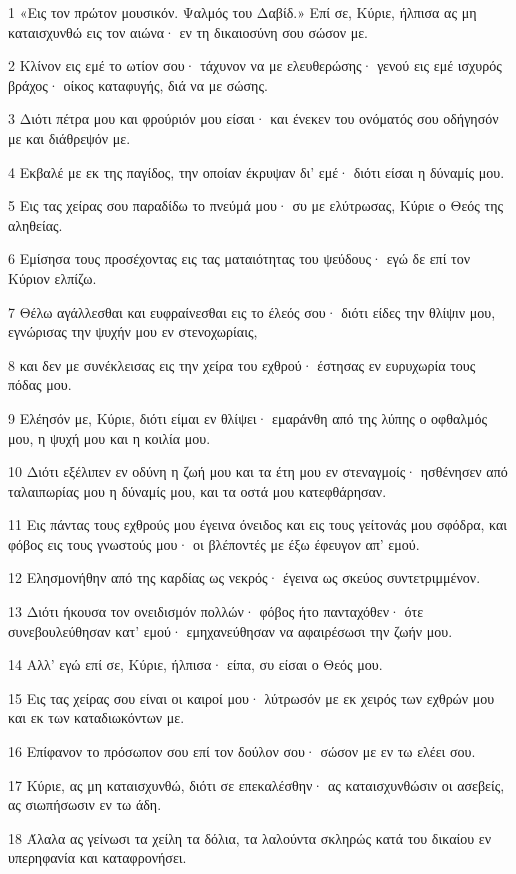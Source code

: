 \par 1 «Εις τον πρώτον μουσικόν. Ψαλμός του Δαβίδ.» Επί σε, Κύριε, ήλπισα ας μη καταισχυνθώ εις τον αιώνα· εν τη δικαιοσύνη σου σώσον με.
\par 2 Κλίνον εις εμέ το ωτίον σου· τάχυνον να με ελευθερώσης· γενού εις εμέ ισχυρός βράχος· οίκος καταφυγής, διά να με σώσης.
\par 3 Διότι πέτρα μου και φρούριόν μου είσαι· και ένεκεν του ονόματός σου οδήγησόν με και διάθρεψόν με.
\par 4 Εκβαλέ με εκ της παγίδος, την οποίαν έκρυψαν δι' εμέ· διότι είσαι η δύναμίς μου.
\par 5 Εις τας χείρας σου παραδίδω το πνεύμά μου· συ με ελύτρωσας, Κύριε ο Θεός της αληθείας.
\par 6 Εμίσησα τους προσέχοντας εις τας ματαιότητας του ψεύδους· εγώ δε επί τον Κύριον ελπίζω.
\par 7 Θέλω αγάλλεσθαι και ευφραίνεσθαι εις το έλεός σου· διότι είδες την θλίψιν μου, εγνώρισας την ψυχήν μου εν στενοχωρίαις,
\par 8 και δεν με συνέκλεισας εις την χείρα του εχθρού· έστησας εν ευρυχωρία τους πόδας μου.
\par 9 Ελέησόν με, Κύριε, διότι είμαι εν θλίψει· εμαράνθη από της λύπης ο οφθαλμός μου, η ψυχή μου και η κοιλία μου.
\par 10 Διότι εξέλιπεν εν οδύνη η ζωή μου και τα έτη μου εν στεναγμοίς· ησθένησεν από ταλαιπωρίας μου η δύναμίς μου, και τα οστά μου κατεφθάρησαν.
\par 11 Εις πάντας τους εχθρούς μου έγεινα όνειδος και εις τους γείτονάς μου σφόδρα, και φόβος εις τους γνωστούς μου· οι βλέποντές με έξω έφευγον απ' εμού.
\par 12 Ελησμονήθην από της καρδίας ως νεκρός· έγεινα ως σκεύος συντετριμμένον.
\par 13 Διότι ήκουσα τον ονειδισμόν πολλών· φόβος ήτο πανταχόθεν· ότε συνεβουλεύθησαν κατ' εμού· εμηχανεύθησαν να αφαιρέσωσι την ζωήν μου.
\par 14 Αλλ' εγώ επί σε, Κύριε, ήλπισα· είπα, συ είσαι ο Θεός μου.
\par 15 Εις τας χείρας σου είναι οι καιροί μου· λύτρωσόν με εκ χειρός των εχθρών μου και εκ των καταδιωκόντων με.
\par 16 Επίφανον το πρόσωπον σου επί τον δούλον σου· σώσον με εν τω ελέει σου.
\par 17 Κύριε, ας μη καταισχυνθώ, διότι σε επεκαλέσθην· ας καταισχυνθώσιν οι ασεβείς, ας σιωπήσωσιν εν τω άδη.
\par 18 Άλαλα ας γείνωσι τα χείλη τα δόλια, τα λαλούντα σκληρώς κατά του δικαίου εν υπερηφανία και καταφρονήσει.
